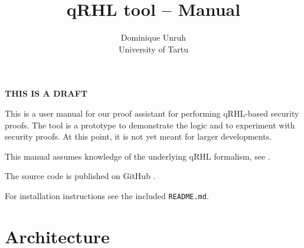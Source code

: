 \documentclass{article}
\begin{document}
\title{qRHL tool -- Manual}
\author{Dominique Unruh\\\small University of Tartu}
\date{}


 

\maketitle

\ifdraft
\begin{center}
  \LARGE\bfseries
  THIS IS A DRAFT
\end{center}
\fi

\let\subsubsection\subsection
\let\subsection\section



This is a user manual for our proof assistant for
performing qRHL-based security proofs.  The tool is a prototype to
demonstrate the logic and to experiment with security proofs. At this
point, it is not yet meant for larger developments.

This manual assumes knowledge of the underlying qRHL formalism, see
\cite{qrhl-paper-from-manual}.

The source code is published on GitHub \cite{github-source}.

For installation instructions see the included \texttt{README.md}.


\subsection{Architecture}
\end{document}
